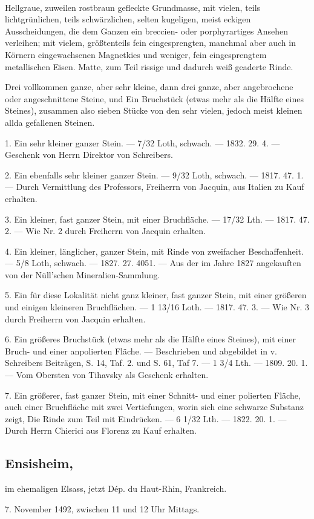 \documentclass[a4paper, 11pt, oneside, polutonikogreek, german]{article}
\begin{document}
\paragraph{}
Hellgraue, zuweilen rostbraun gefleckte Grundmasse, mit vielen, teils lichtgrünlichen, teils schwärzlichen, selten kugeligen, meist eckigen Ausscheidungen, die dem Ganzen ein breccien- oder porphyrartiges Ansehen verleihen; mit vielem, größtenteils fein eingesprengten, manchmal aber auch in Körnern eingewachsenen Magnetkies und weniger, fein eingesprengtem metallischen Eisen. Matte, zum Teil rissige und dadurch weiß geaderte Rinde.

Drei vollkommen ganze, aber sehr kleine, dann drei ganze, aber angebrochene oder angeschnittene Steine, und Ein Bruchstück (etwas mehr als die Hälfte eines Steines), zusammen also sieben Stücke von den sehr vielen, jedoch meist kleinen allda gefallenen Steinen.

1. Ein sehr kleiner ganzer Stein. — 7/32 Loth, schwach. — 1832. 29. 4. — Geschenk von Herrn Direktor von Schreibers.

2. Ein ebenfalls sehr kleiner ganzer Stein. — 9/32 Loth, schwach. — 1817. 47. 1. — Durch Vermittlung des Professors, Freiherrn von Jacquin, aus Italien zu Kauf erhalten.

3. Ein kleiner, fast ganzer Stein, mit einer Bruchfläche. — 17/32 Lth. — 1817. 47. 2. — Wie Nr. 2 durch Freiherrn von Jacquin erhalten.

4. Ein kleiner, länglicher, ganzer Stein, mit Rinde von zweifacher Beschaffenheit. — 5/8 Loth, schwach. — 1827. 27. 4051. — Aus der im Jahre 1827 angekauften von der Nüll'schen Mineralien-Sammlung.

5. Ein für diese Lokalität nicht ganz kleiner, fast ganzer Stein, mit einer größeren und einigen kleineren Bruchflächen. — 1 13/16 Loth. — 1817. 47. 3. — Wie Nr. 3 durch Freiherrn von Jacquin erhalten.

6. Ein größeres Bruchstück (etwas mehr als die Hälfte eines Steines), mit einer Bruch- und einer anpolierten Fläche. — Beschrieben und abgebildet in v. Schreibers Beiträgen, S. 14, Taf. 2. und S. 61, Taf 7. — 1 3/4 Lth. — 1809. 20. 1. — Vom Obersten von Tihavsky als Geschenk erhalten.

7. Ein größerer, fast ganzer Stein, mit einer Schnitt- und einer polierten Fläche, auch einer Bruchfläche mit zwei Vertiefungen, worin sich eine schwarze Substanz zeigt, Die Rinde zum Teil mit Eindrücken. — 6 1/32 Lth. — 1822. 20. 1. — Durch Herrn Chierici aus Florenz zu Kauf erhalten.
\subsection{Ensisheim,}
\begin{center}
\small
im ehemaligen Elsass, jetzt Dép. du Haut-Rhin, Frankreich.

7. November 1492, zwischen 11 und 12 Uhr Mittags.
\end{center}
\end{document}
